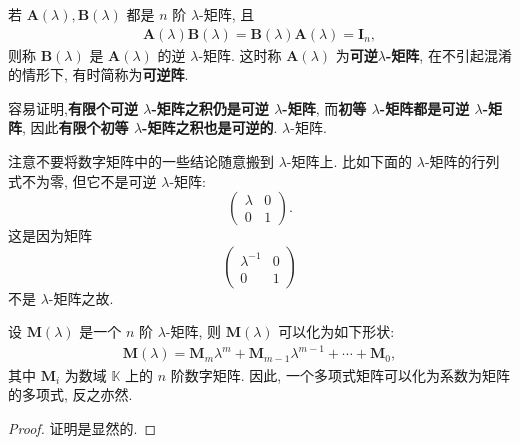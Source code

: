 \documentclass[../../main.tex]{subfiles}%
\begin{document}
\begin{definition}[可逆$\lambda$-矩阵]
若 $\boldsymbol{A}(\lambda),\boldsymbol{B}(\lambda)$ 都是 $n$ 阶 $\lambda$-矩阵, 且
\begin{align*}
\boldsymbol{A}(\lambda)\boldsymbol{B}(\lambda)=\boldsymbol{B}(\lambda)\boldsymbol{A}(\lambda)=\boldsymbol{I}_n,
\end{align*}
则称 $\boldsymbol{B}(\lambda)$ 是 $\boldsymbol{A}(\lambda)$ 的逆 $\lambda$-矩阵. 这时称 $\boldsymbol{A}(\lambda)$ 为\textbf{可逆$\lambda$-矩阵}, 在不引起混淆的情形下, 有时简称为\textbf{可逆阵}. 
\end{definition}
\begin{note}
容易证明,\textbf{有限个可逆 $\lambda$-矩阵之积仍是可逆 $\lambda$-矩阵}, 而\textbf{初等 $\lambda$-矩阵都是可逆 $\lambda$-矩阵}, 因此\textbf{有限个初等 $\lambda$-矩阵之积也是可逆的}. $\lambda$-矩阵.  
\end{note}
\begin{remark}
注意不要将数字矩阵中的一些结论随意搬到 $\lambda$-矩阵上. 比如下面的 $\lambda$-矩阵的行列式不为零, 但它不是可逆 $\lambda$-矩阵:
\[
\begin{pmatrix}
\lambda & 0 \\
0 & 1
\end{pmatrix}.
\]
这是因为矩阵
\[
\begin{pmatrix}
\lambda^{-1} & 0 \\
0 & 1
\end{pmatrix}
\]
不是 $\lambda$-矩阵之故. 
\end{remark}

\begin{lemma}
设 $\boldsymbol{M}(\lambda)$ 是一个 $n$ 阶 $\lambda$-矩阵, 则 $\boldsymbol{M}(\lambda)$ 可以化为如下形状:
\begin{align*}
\boldsymbol{M}(\lambda)=\boldsymbol{M}_m\lambda^m+\boldsymbol{M}_{m - 1}\lambda^{m - 1}+\cdots+\boldsymbol{M}_0,
\end{align*}
其中 $\boldsymbol{M}_i$ 为数域 $\mathbb{K}$ 上的 $n$ 阶数字矩阵. 因此, 一个多项式矩阵可以化为系数为矩阵的多项式, 反之亦然. 
\end{lemma}
\begin{proof}

证明是显然的.

\end{proof}
\end{document}

